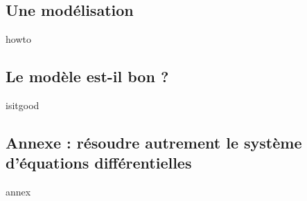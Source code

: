\subsection{Une modélisation}

{howto}



\subsection{Le modèle est-il bon ?}

{isitgood}



\subsection{Annexe : résoudre autrement le système d'équations différentielles}

{annex}
